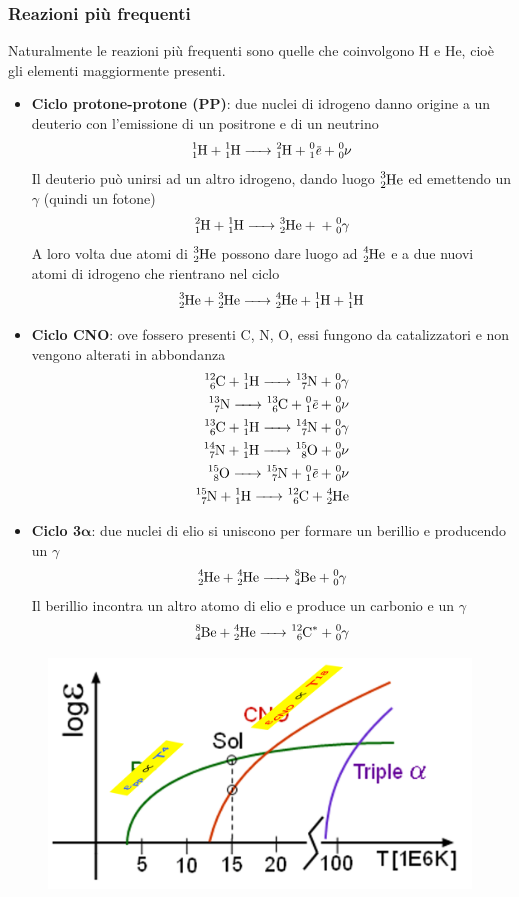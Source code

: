 \subsubsection{Reazioni più frequenti}
Naturalmente le reazioni più frequenti sono quelle che coinvolgono H e He, cioè gli elementi maggiormente presenti.
\begin{itemize}
    \item \textbf{Ciclo protone-protone (PP)}: due nuclei di idrogeno danno origine a un deuterio con l'emissione di un positrone e di un neutrino
    $$\ce{_1^1H + _1^1H -> _1^2H + _1^0\myol{\textit{e}} + _0^0\nu}$$
    Il deuterio può unirsi ad un altro idrogeno, dando luogo $\ce{_2^3He}$ ed emettendo un $\gamma$ (quindi un fotone)
    $$\ce{_1^2H + _1^1H -> _2^3He + + _0^0\gamma}$$
    A loro volta due atomi di $\ce{_2^3He}$ possono dare luogo ad $\ce{_2^4He}$ e a due nuovi atomi di idrogeno che rientrano nel ciclo
    $$\ce{_2^3He + _2^3He -> _2^4He + _1^1H + _1^1H}$$
    \item \textbf{Ciclo CNO}: ove fossero presenti C, N, O, essi fungono da catalizzatori e non vengono alterati in abbondanza
    \begin{eqnarray*}
        \ce{_6^{12}C + _1^1H -> _7^{13}N + _0^0\gamma}\\
        \ce{_7^{13}N -> _6^{13}C + _1^0\myol{\textit{e}} + _0^0\nu}\\
        \ce{_6^{13}C + _1^1H -> _7^{14}N + _0^0\gamma}\\
        \ce{_7^{14}N + _1^1H -> _8^{15}O + _0^0\nu}\\
        \ce{_8^{15}O -> _7^{15}N + _1^0\myol{\textit{e}} + _0^0\nu}\\
        \ce{_7^{15}N + _1^1H -> _6^{12}C + _2^4He}
    \end{eqnarray*}
    \item \textbf{Ciclo 3$\boldsymbol{\alpha}$}: due nuclei di elio si uniscono per formare un berillio e producendo un $\gamma$
    $$\ce{_2^4He + _2^4He -> _4^8Be + _0^0\gamma}$$
    Il berillio incontra un altro atomo di elio e produce un carbonio e un $\gamma$
    $$\ce{_4^8Be + _2^4He -> _6^{12}C^* + _0^0\gamma}$$
\end{itemize}

\begin{figure}[H]
    \centering
    \includegraphics[scale=0.7]{reazioni.png}
\end{figure}

